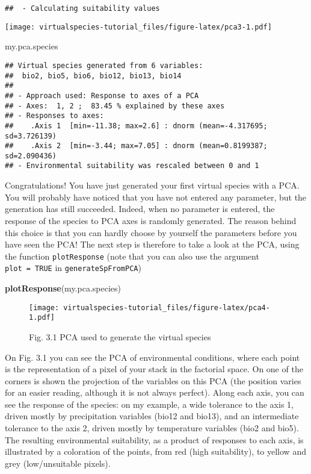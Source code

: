 \documentclass[]{article}
\newenvironment{Shaded}{\begin{snugshade}}{\end{snugshade}}
\newcommand{\KeywordTok}[1]{\textcolor[rgb]{0.13,0.29,0.53}{\textbf{#1}}}
\newcommand{\NormalTok}[1]{#1}
\begin{document}
\begin{verbatim}
##  - Calculating suitability values
\end{verbatim}

\texttt{[image: virtualspecies-tutorial\_files/figure-latex/pca3-1.pdf]}

\begin{Shaded}
\begin{Highlighting}[]
\NormalTok{my.pca.species}
\end{Highlighting}
\end{Shaded}

\begin{verbatim}
## Virtual species generated from 6 variables:
##  bio2, bio5, bio6, bio12, bio13, bio14
## 
## - Approach used: Response to axes of a PCA
## - Axes:  1, 2 ;  83.45 % explained by these axes
## - Responses to axes:
##    .Axis 1  [min=-11.38; max=2.6] : dnorm (mean=-4.317695; sd=3.726139)
##    .Axis 2  [min=-3.44; max=7.05] : dnorm (mean=0.8199387; sd=2.090436)
## - Environmental suitability was rescaled between 0 and 1
\end{verbatim}

Congratulations! You have just generated your first virtual species with
a PCA. You will probably have noticed that you have not entered any
parameter, but the generation has still succeeded. Indeed, when no
parameter is entered, the response of the species to PCA axes is
randomly generated. The reason behind this choice is that you can hardly
choose by yourself the parameters before you have seen the PCA! The next
step is therefore to take a look at the PCA, using the function
\texttt{plotResponse} (note that you can also use the argument
\texttt{plot\ =\ TRUE} in \texttt{generateSpFromPCA})

\begin{Shaded}
\begin{Highlighting}[]
\KeywordTok{plotResponse}\NormalTok{(my.pca.species)}
\end{Highlighting}
\end{Shaded}

\begin{figure}
\centering
\texttt{[image: virtualspecies-tutorial\_files/figure-latex/pca4-1.pdf]}
\caption{Fig. 3.1 PCA used to generate the virtual species}
\end{figure}

On Fig. 3.1 you can see the PCA of environmental conditions, where each
point is the representation of a pixel of your stack in the factorial
space. On one of the corners is shown the projection of the variables on
this PCA (the position varies for an easier reading, although it is not
always perfect). Along each axis, you can see the response of the
species: on my example, a wide tolerance to the axis 1, driven mostly by
precipitation variables (bio12 and bio13), and an intermediate tolerance
to the axis 2, driven mostly by temperature variables (bio2 and bio5).
The resulting environmental suitability, as a product of responses to
each axis, is illustrated by a coloration of the points, from red (high
suitability), to yellow and grey (low/unsuitable pixels).
\end{document}
